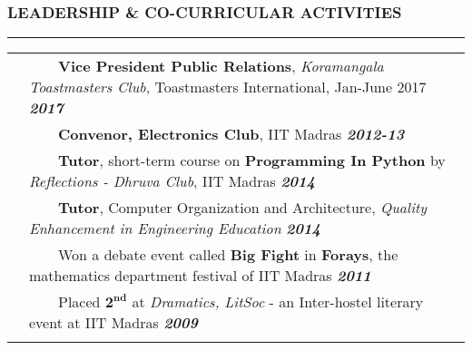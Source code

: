 \documentclass[10pt,a4paper,English]{article}
\newcommand{\lv}{\color{table-border}\vrule}
\newcommand{\lh}{\arrayrulecolor{table-border}}
\newcommand\roottitle[1]{\vspace{-4mm}\subsubsection*{\uppercase{#1}}\vspace{-0.3em}\nopagebreak[4]\hrule}
\newcommand\itemyear[1]{\hfill \textbf{\emph{\color{itemyear} #1}}}
\newcommand{\tabitem}{~~\llap{\textbullet}~~}
\begin{document}
\roottitle{Leadership \& Co-curricular Activities}
\renewcommand{\arraystretch}{1.2}
\setlength\tabcolsep{5pt}
\begin{tabularx}{\textwidth}{ !{\lv} >{} c !{\lv} X !{\lv} }
& \tabitem \textbf{Vice President Public Relations}, \textit{Koramangala Toastmasters Club}, Toastmasters International, Jan-June 2017 \itemyear{2017} \\
& \tabitem \textbf{Convenor, Electronics Club}, IIT Madras \itemyear{2012-13}\\
& \tabitem \textbf{Tutor}, short-term course on \textbf{Programming In Python} by \emph{Reflections - Dhruva Club}, IIT Madras \itemyear{ 2014 } \\
& \tabitem \textbf{Tutor}, Computer Organization and Architecture, \emph{Quality Enhancement in Engineering Education} \itemyear{2014} \\
& \tabitem Won a debate event called \textbf{Big Fight} in \textbf{Forays}, the mathematics department festival of IIT Madras \itemyear{2011} \\
& \tabitem Placed $\mathbf{2^{nd}}$ at \emph{Dramatics, LitSoc} - an Inter-hostel literary event at IIT Madras \itemyear{2009} \\ 
\lh \hline
\end{tabularx}
\vspace{2mm}

\end{document}
